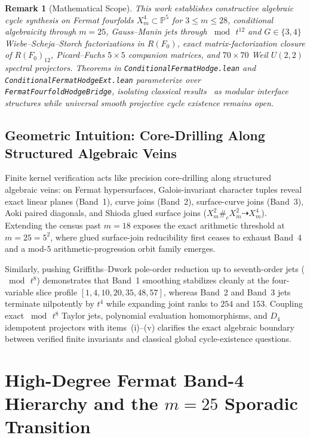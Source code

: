 \documentclass[11pt,a4paper]{article}
\newtheorem{remark}[theorem]{Remark}
\begin{document}
\begin{remark}[Mathematical Scope]
This work establishes constructive algebraic cycle synthesis on Fermat fourfolds $X_m^4 \subset \mathbb{P}^5$ for $3 \le m \le 28$, conditional algebraicity through $m = 25$, Gauss--Manin jets through $\bmod\, t^{12}$ and $G \in \{3,4\}$ Wiebe--Scheja--Storch factorizations in $R(F_0)$, exact matrix-factorization closure of $R(F_0)_{12}$, Picard--Fuchs $5\times 5$ companion matrices, and $70\times 70$ Weil $U(2,2)$ spectral projectors. Theorems in \texttt{ConditionalFermatHodge.lean} and \texttt{ConditionalFermatHodgeExt.lean} parameterize over \texttt{FermatFourfoldHodgeBridge}, isolating classical results~\cite{Lefschetz1924,Griffiths1969,Shioda1979,Aoki1983,Deligne2000} as modular interface structures while universal smooth projective cycle existence remains open.
\end{remark}

\subsection{Geometric Intuition: Core-Drilling Along Structured Algebraic Veins}

Finite kernel verification acts like precision core-drilling along structured algebraic veins: on Fermat hypersurfaces, Galois-invariant character tuples reveal exact linear planes (Band~1), curve joins (Band~2), surface-curve joins (Band~3), Aoki paired diagonals, and Shioda glued surface joins ($X_m^2 \#_c X_m^2 \dashrightarrow X_m^4$). Extending the census past $m = 18$ exposes the exact arithmetic threshold at $m = 25 = 5^2$, where glued surface-join reducibility first ceases to exhaust Band~4 and a mod-$5$ arithmetic-progression orbit family emerges.

Similarly, pushing Griffiths--Dwork pole-order reduction up to seventh-order jets ($\bmod\, t^8$) demonstrates that Band~1 smoothing stabilizes cleanly at the four-variable slice profile $[1, 4, 10, 20, 35, 48, 57]$, whereas Band~2 and Band~3 jets terminate nilpotently by $t^4$ while expanding joint ranks to $254$ and $153$. Coupling exact $\bmod\, t^8$ Taylor jets, polynomial evaluation homomorphisms, and $D_4$ idempotent projectors with items~(i)--(v) clarifies the exact algebraic boundary between verified finite invariants and classical global cycle-existence questions.

\section{High-Degree Fermat Band-4 Hierarchy and the $m = 25$ Sporadic Transition}
\end{document}
